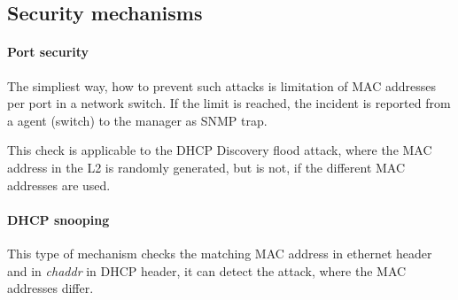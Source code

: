 \documentclass[10pt,a4paper,titlepage]{article}
\begin{document}
\subsection*{Security mechanisms}

\paragraph{Port security}
The simpliest way, how to prevent such attacks is limitation of MAC addresses
per port in a network switch. If the limit is reached, the incident is reported
from a agent (switch) to the manager as SNMP trap.

This check is applicable to the DHCP Discovery flood attack, where the MAC address
in the L2 is randomly generated, but is not, if the different MAC addresses are used.

\paragraph{DHCP snooping}
This type of mechanism checks the matching MAC address in ethernet header
and in {\it chaddr} in DHCP header, it can detect the attack, where the MAC
addresses differ.



\newpage
\printbibliography
\end{document}

